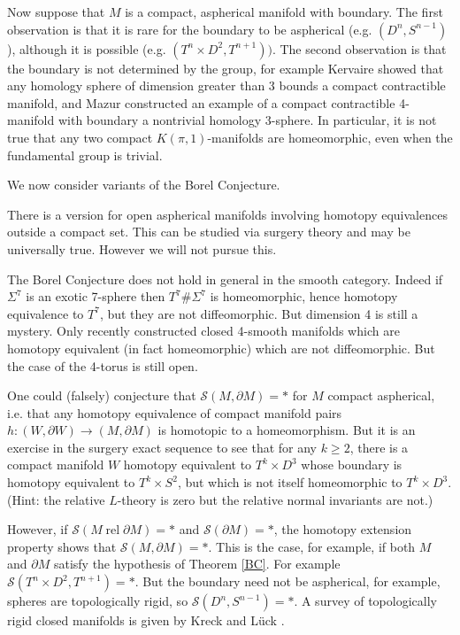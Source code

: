 \documentclass[12pt]{amsart}
\theoremstyle{definition}
\DeclareMathOperator{\rel}{rel}
\newcommand{\cS}{\mathcal S}
\begin{document}
Now suppose that $M$ is a compact, aspherical manifold with boundary.    The first observation is that it is rare for the boundary to be aspherical (e.g. $(D^n,S^{n-1})$), although it is possible (e.g. $(T^n \times D^2, T^{n+1}))$.    The second observation is that the boundary is not determined by the group, for example Kervaire showed that any homology sphere of dimension greater than 3 bounds a compact contractible manifold, and Mazur constructed an example of a compact contractible 4-manifold with boundary a nontrivial homology 3-sphere.
In particular, it is not true that any two compact $K(\pi,1)$-manifolds are homeomorphic, even when the fundamental group is trivial.   







We now consider variants of the Borel Conjecture.   

There is a version for open aspherical manifolds involving homotopy equivalences outside a compact set.   This can be studied via surgery theory and may be universally true.   However we will not pursue this.   

The Borel Conjecture does not hold in general in the smooth category.   Indeed if $\Sigma^7$ is an exotic 7-sphere then $T^7 \# \Sigma^7$ is homeomorphic, hence homotopy equivalence to $T^7$, but they are not diffeomorphic.   But dimension 4 is still a mystery.   Only recently \cite{DHHRS} constructed closed 4-smooth manifolds which are homotopy equivalent (in fact homeomorphic) which are not diffeomorphic.   But the case of the 4-torus is still open.

One could (falsely) conjecture that $\cS(M, \partial M) = *$ for $M$ compact aspherical, i.e. that any homotopy equivalence of compact manifold pairs $h : (W, \partial W) \to (M, \partial M)$ is homotopic to a homeomorphism.    But it is an exercise in the surgery exact sequence to see that for any $k \geq 2$, there is a compact manifold $W$ homotopy equivalent to $T^k \times D^3$ whose boundary is homotopy equivalent to $T^k \times S^2$,
but which is not itself homeomorphic to $T^k\times{D^3}$.
 (Hint: the relative $L$-theory is zero but the relative normal invariants are not.)    
 
 However, if $\cS(M \rel\partial M) = *$ and $\cS(\partial M) = *$, the homotopy extension property shows that $\cS(M, \partial M) = *$.  
  This is the case, for example, if both $M$ and $\partial M$ satisfy the hypothesis of Theorem \ref{BC}.   For example $\cS(T^n \times D^2, T^{n+1}) = *$.    But the boundary need not be aspherical, for example, spheres are topologically rigid, so  $\cS(D^n,S^{n-1})=*$.   A survey of topologically rigid closed manifolds is given by Kreck and L\"uck \cite{KL}.
 
\end{document}
